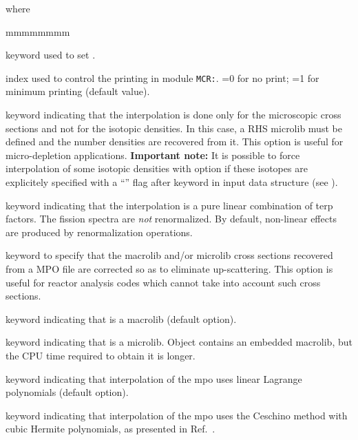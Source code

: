\noindent where
\begin{ListeDeDescription}{mmmmmmmm}

\item[\moc{EDIT}] keyword used to set .

\item[\dusa{iprint}] index used to control the printing in module {\tt MCR:}. =0 for no print; =1 for minimum printing (default value).
 
\item[\moc{RES}] keyword indicating that the interpolation is done only for the microscopic cross sections and not for the isotopic densities. In this case, a RHS {\sc microlib} must be defined and the number densities are recovered from it. This option is useful for micro-depletion applications. {\bf Important note:} It is possible to force interpolation of some isotopic densities with  option if these
isotopes are explicitely specified with a ``\moc{*}'' flag after  keyword in  input data structure (see ).

\item[\moc{PURE}] keyword indicating that the interpolation is a pure linear combination of terp factors. The fission spectra are {\sl not}
renormalized. By default, non-linear effects are produced by renormalization operations.

\item[\moc{UPS}] keyword to specify that the macrolib and/or microlib cross sections recovered from a MPO file are
corrected so as to eliminate up-scattering. This option is useful for reactor analysis codes which cannot
take into account such cross sections.

\item[\moc{MACRO}] keyword indicating that  is a {\sc macrolib} (default option).

\item[\moc{MICRO}] keyword indicating that  is a {\sc microlib}. Object  contains an embedded {\sc macrolib}, but the CPU time required to obtain it is longer.

\item[\moc{LINEAR}] keyword indicating that interpolation of the {\sc mpo} uses linear Lagrange polynomials (default option).

\item[\moc{CUBIC}] keyword indicating that interpolation of the {\sc mpo} uses the Ceschino method
with cubic Hermite polynomials, as presented in Ref.~.


\end{ListeDeDescription}
